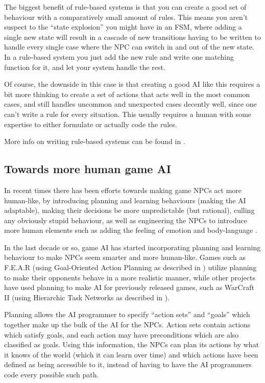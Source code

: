 \documentclass[]{report}
\begin{document}
The biggest benefit of rule-based systems is that you can create a good set of
behaviour with a comparatively small amount of rules. This means you aren't
suspect to the ``state explosion'' you might have in an FSM, where adding a
single new state will result in a cascade of new transitions having to be
written to handle every single case where the NPC can switch in and out of the
new state. In a rule-based system you just add the new rule and write one
matching function for it, and let your system handle the rest.

Of course, the downside in this case is that creating a good AI like this
requires a bit more thinking to create a set of actions that acts well in the
most common cases, and still handles uncommon and unexpected cases decently
well, since one can't write a rule for every situation. This usually requires a
human with some expertise to either formulate or actually code the rules.

More info on writing rule-based systems can be found in
\citet[chap.~4]{kirby2011introduction}.

\subsection{Towards more human game AI}
\label{sec:towards-more-human}

In recent times there has been efforts towards making game NPCs act more
human-like, by introducing planning and learning behaviours (making the AI
adaptable), making their decisions be more unpredictable (but rational), culling
any obviously stupid behaviour, as well as engineering the NPCs to introduce
more human elements such as adding the feeling of emotion and body-language
\citep{spronck2005adaptive}.

In the last decade or so, game AI has started incorporating planning and
learning behaviour to make NPCs seem smarter and more human-like. Games such as
F.E.A.R (using Goal-Oriented Action Planning as described in
\citet{orkin2006three}) utilize planning to make their opponents behave in a
more realistic manner, while other projects have used planning to make AI for
previously released games, such as WarCraft II (using Hierarchic Task Networks
as described in \citet{brickmanhtn}).

Planning allows the AI programmer to specify ``action sets'' and ``goals'' which
together make up the bulk of the AI for the NPCs. Action sets contain actions
which satisfy goals, and each action may have preconditions which are also
classified as goals. Using this information, the NPCs can plan its actions by
what it knows of the world (which it can learn over time) and which actions have
been defined as being accessible to it, instead of having to have the AI
programmers code every possible such path.
\end{document}
